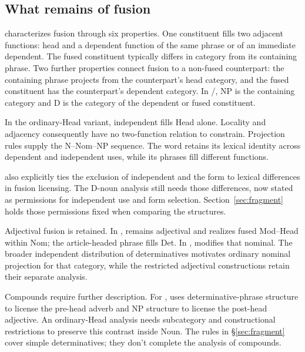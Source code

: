 \documentclass[12pt]{article}
\begin{document}
\subsection{What remains of fusion}

\textcite{Payne2007} characterizes fusion through six properties. One constituent fills two adjacent functions: head and a dependent function of the same phrase or of an immediate dependent. The fused constituent typically differs in category from its containing phrase. Two further properties connect fusion to a non-fused counterpart: the containing phrase projects from the counterpart's head category, and the fused constituent has the counterpart's dependent category. In /, NP is the containing category and D is the category of the dependent or fused constituent.

In the ordinary-Head variant, independent  fills Head alone. Locality and adjacency consequently have no two-function relation to constrain. Projection rules supply the N--Nom--NP sequence. The word  retains its lexical identity across dependent and independent uses, while its phrases fill different functions.

\textcite{Payne2007} also explicitly ties the exclusion of independent  and the form  to lexical differences in fusion licensing. The D-noun analysis still needs those differences, now stated as permissions for independent use and form selection. Section~\ref{sec:fragment} holds those permissions fixed when comparing the structures.

Adjectival fusion is retained. In ,  remains adjectival and realizes fused Mod--Head within Nom; the article-headed phrase fills Det. In ,  modifies that nominal. The broader independent distribution of determinatives motivates ordinary nominal projection for that category, while the restricted adjectival constructions retain their separate analysis.

Compounds require further description. For , \textcite{Payne2007} uses determinative-phrase structure to license the pre-head adverb and NP structure to license the post-head adjective. An ordinary-Head analysis needs subcategory and constructional restrictions to preserve this contrast inside Noun. The rules in §\ref{sec:fragment} cover simple determinatives; they don't complete the analysis of compounds.
\end{document}
